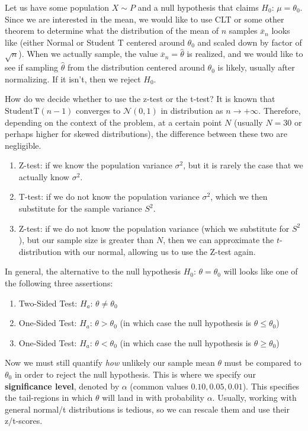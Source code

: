 \documentclass{article}
\begin{document}
    Let us have some population $X \sim P$ and a null hypothesis that claims $H_0 : \, \mu = \theta_0$. Since we are interested in the mean, we would like to use CLT or some other theorem to determine what the distribution of the mean of $n$ samples $\overline{x}_n$ looks like (either Normal or Student T centered around $\theta_0$ and scaled down by factor of $\sqrt{n}$). When we actually sample, the value $\overline{x}_n = \hat{\theta}$ is realized, and we would like to see if sampling $\hat{\theta}$ from the distribution centered around $\theta_0$ is likely, usually after normalizing. If it isn't, then we reject $H_0$. 

    How do we decide whether to use the z-test or the t-test? It is known that $\mathrm{StudentT}(n-1)$ converges to $\mathcal{N}(0, 1)$ in distribution as $n \rightarrow +\infty$. Therefore, depending on the context of the problem, at a certain point $N$ (usually $N = 30$ or perhaps higher for skewed distributions), the difference between these two are negligible. 
    \begin{enumerate}
      \item Z-test: if we know the population variance $\sigma^2$, but it is rarely the case that we actually know $\sigma^2$. 
      \item T-test: if we do not know the population variance $\sigma^2$, which we then substitute for the sample variance $S^2$. 
      \item Z-test: if we do not know the population variance (which we substitute for $S^2$), but our sample size is greater than $N$, then we can approximate the $t$-distribution with our normal, allowing us to use the Z-test again. 
    \end{enumerate}

    In general, the alternative to the null hypothesis $H_0 : \, \theta = \theta_0$ will looks like one of the following three assertions: 
    \begin{enumerate}
      \item Two-Sided Test: $H_a : \, \theta \neq \theta_0$ 
      \item One-Sided Test: $H_a : \, \theta > \theta_0$ (in which case the null hypothesis is $\theta \leq \theta_0$) 
      \item One-Sided Test: $H_a : \, \theta < \theta_0$ (in which case the null hypothesis is $\theta \geq \theta_0$) 
    \end{enumerate}

    Now we must still quantify \textit{how} unlikely our sample mean $\theta$ must be compared to $\theta_0$ in order to reject the null hypothesis. This is where we specify our \textbf{significance level}, denoted by $\alpha$ (common values $0.10, 0.05, 0.01$). This specifies the tail-regions in which $\theta$ will land in with probability $\alpha$. Usually, working with general normal/t distributions is tedious, so we can rescale them and use their z/t-scores. 
\end{document}
